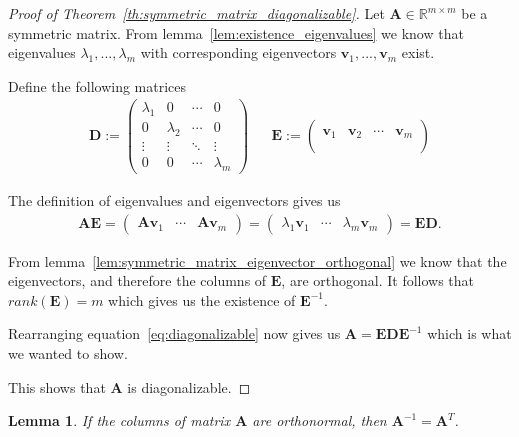 \documentclass[a4paper]{IEEEtran}
\newtheorem{lemma}{Lemma}
\begin{document}
\begin{proof}[Proof of Theorem~\ref{th:symmetric_matrix_diagonalizable}]
	Let $\mathbf{A} \in \mathbb{R}^{m\times m}$ be a symmetric matrix. From lemma~\ref{lem:existence_eigenvalues} we know that eigenvalues $\lambda_1, ..., \lambda_m$ with corresponding eigenvectors $\mathbf{v}_1, ..., \mathbf{v}_m$ exist.
	
	Define the following matrices
	\begin{align*}
		\mathbf{D} := \left(\begin{matrix}
			\lambda_1 & 0 & \cdots & 0\\
			0 & \lambda_2 & \cdots & 0\\
			\vdots & \vdots & \ddots & \vdots\\
			0 & 0 & \cdots & \lambda_m
		\end{matrix}\right) &&
		\mathbf{E} := \left(\begin{matrix}
			 & & &\\
			\mathbf{v}_1 & \mathbf{v}_2 & \cdots & \mathbf{v}_m\\
			 & & &\\
		\end{matrix}\right)
	\end{align*}
	
	The definition of eigenvalues and eigenvectors gives us
	\begin{align}
		\label{eq:diagonalizable}
		\mathbf{AE} = \left(\begin{matrix}
			\mathbf{Av}_1 & \cdots & \mathbf{Av}_m
		\end{matrix}\right) = \left(\begin{matrix}
			\lambda_1\mathbf{v}_1 & \cdots & \lambda_m\mathbf{v}_m
		\end{matrix}\right) = \mathbf{ED}.
	\end{align}
	
	From lemma~\ref{lem:symmetric_matrix_eigenvector_orthogonal} we know that the eigenvectors, and therefore the columns of $\mathbf{E}$, are orthogonal. It follows that $rank(\mathbf{E}) = m$ which gives us the existence of $\mathbf{E}^{-1}$.
	
	Rearranging equation~\ref{eq:diagonalizable} now gives us $\mathbf{A} = \mathbf{EDE}^{-1}$ which is what we wanted to show.
	
	This shows that $\mathbf{A}$ is diagonalizable.
\end{proof}

\begin{lemma}
	\label{lem:inverse_is_transpose}
	If the columns of matrix $\mathbf{A}$ are orthonormal, then $\mathbf{A}^{-1} = \mathbf{A}^T$.
\end{lemma}
\end{document}
